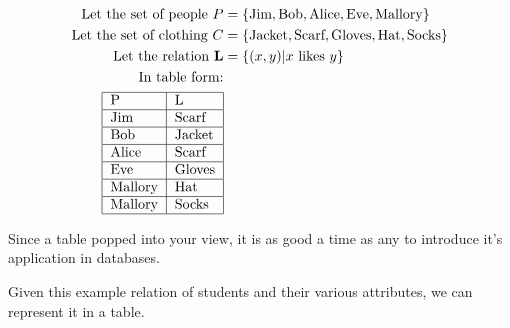 \documentclass{article}
\begin{document}
\begin{align*}
    \text{Let the set of people } P     & = \{\text{Jim}, \text{Bob}, \text{Alice}, \text{Eve}, \text{Mallory}\}     \\
    \text{Let the set of clothing } C   & = \{\text{Jacket}, \text{Scarf}, \text{Gloves}, \text{Hat}, \text{Socks}\} \\
    \text{Let the relation } \mathbf{L} & = \{(x, y) | x \text{ likes } y\}                                          \\
    \text{In table form:}                                                                                            \\
    \begin{tabular}{|l|l|l|l|l|l|l|}
        \hline
        P       & L      \\
        \hline
        Jim     & Scarf  \\
        \hline
        Bob     & Jacket \\
        \hline
        Alice   & Scarf  \\
        \hline
        Eve     & Gloves \\
        \hline
        Mallory & Hat    \\
        \hline
        Mallory & Socks  \\
        \hline
    \end{tabular}
\end{align*}

Since a table popped into your view, it is as good a time as any to introduce it's application in databases.

Given this example relation of students and their various attributes, we can represent it in a table.
\end{document}
